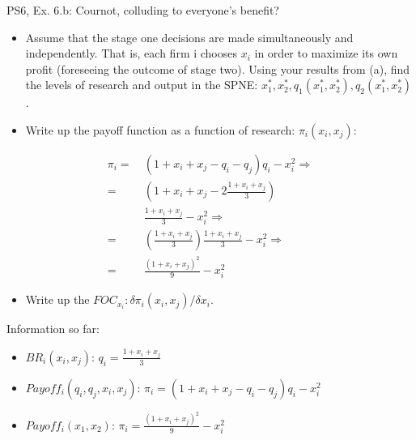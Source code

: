 \begin{frame}{PS6, Ex. 6.b: Cournot, colluding to everyone's benefit?}
    \begin{itemize}
    \item[(b)] Assume that the stage one decisions are made simultaneously and independently. That is, each firm i chooses $x_i$ in order to maximize its own profit (foreseeing the outcome of stage two). Using your results from (a), find the levels of research and output in the SPNE: $x_1^*,x_2^*,q_1(x_1^*,x_2^*),q_2(x_1^*,x_2^*)$.
    \end{itemize}
  \begin{multicols}{2}
    \begin{itemize}
      \item[(Step 1)] Write up the payoff function as a function of research: $\pi_i(x_i,x_j)$:
    \end{itemize}
    \begin{align*}
      \pi_i =&\ (1+x_i+x_j-q_i-q_j)q_i-x_i^2\Rightarrow\\
            =&\ \left(1+x_i+x_j-2\frac{1+x_i+x_j}{3}\right)\\
             &\ \frac{1+x_i+x_j}{3}-x_i^2\Rightarrow\\
            =&\ \left(\frac{1+x_i+x_j}{3}\right)\frac{1+x_i+x_j}{3}-x_i^2\Rightarrow\\
            =&\ \frac{(1+x_i+x_j)^2}{9}-x_i^2
    \end{align*}
    \begin{itemize}
      \item[(Step 2)] Write up the $FOC_{x_i}:\delta\pi_i(x_i,x_j)/\delta x_i$.
    \end{itemize}
    \vfill\null \columnbreak
    Information so far:
    \begin{itemize}
    \item[1] $BR_i(x_i,x_j)$: $q_i = \frac{1+x_i+x_j}{3}$
    \item[2] $Payoff_i(q_i,q_j,x_i,x_j)$: $\pi_i=(1+x_i+x_j-q_i-q_j)q_i-x_i^2$
    \item[3] $Payoff_i(x_1,x_2)$: $\pi_i=\frac{(1+x_i+x_j)^2}{9}-x_i^2$
    \end{itemize}
    \vfill\null
  \end{multicols}
\end{frame}
